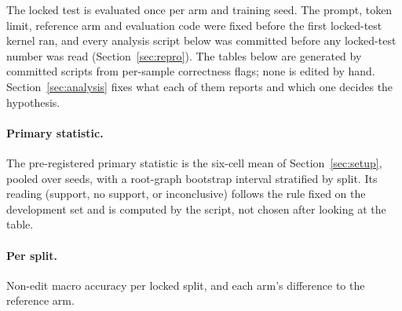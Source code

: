 The locked test is evaluated once per arm and training seed. The prompt, token limit,
reference arm and evaluation code were fixed before the first locked-test kernel ran, and
every analysis script below was committed before any locked-test number was read
(Section~\ref{sec:repro}). The tables below are generated by committed scripts from
per-sample correctness flags; none is edited by hand. Section~\ref{sec:analysis} fixes what
each of them reports and which one decides the hypothesis.

\paragraph{Primary statistic.}
The pre-registered primary statistic is the six-cell mean of Section~\ref{sec:setup}, pooled
over seeds, with a root-graph bootstrap interval stratified by split. Its reading (support,
no support, or inconclusive) follows the rule fixed on the development set and is computed by
the script, not chosen after looking at the table.

\paragraph{Per split.}
Non-edit macro accuracy per locked split, and each arm's difference to the reference arm.

